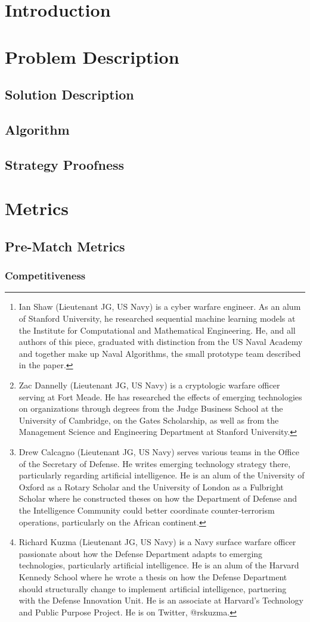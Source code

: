 \documentclass{article}
\title{\projectname}
\author{Ian Shaw \thanks{Ian Shaw (Lieutenant JG, US Navy) is a cyber warfare engineer. As an alum of Stanford University, he researched sequential machine learning models at the Institute for Computational and Mathematical Engineering. He, and all authors of this piece, graduated with distinction from the US Naval Academy and together make up Naval Algorithms, the small prototype team described in the paper. } 
\and Zac Dannelly \thanks{Zac Dannelly (Lieutenant JG, US Navy) is a cryptologic warfare officer serving at Fort Meade. He has researched the effects of emerging technologies on organizations through degrees from the Judge Business School at the University of Cambridge, on the Gates Scholarship, as well as from the Management Science and Engineering Department at Stanford University.}
\and Drew Calcagno \thanks{Drew Calcagno (Lieutenant JG, US Navy) serves various teams in the Office of the Secretary of Defense. He writes emerging technology strategy there, particularly regarding artificial intelligence. He is an alum of the University of Oxford as a Rotary Scholar and the University of London as a Fulbright Scholar where he constructed theses on how the Department of Defense and the Intelligence Community could better coordinate counter-terrorism operations, particularly on the African continent.} 
\and Richard Kuzma \thanks{Richard Kuzma (Lieutenant JG, US Navy) is a Navy surface warfare officer passionate about how the Defense Department adapts to emerging technologies, particularly artificial intelligence. He is an alum of the Harvard Kennedy School where he wrote a thesis on how the Defense Department should structurally change to implement artificial intelligence, partnering with the Defense Innovation Unit. He is an associate at Harvard’s Technology and Public Purpose Project. He is on Twitter, @rskuzma.}}
\begin{document}
\maketitle

\begin{abstract}

\end{abstract}

\newpage

\tableofcontents

\newpage

\section{Introduction}



\section{Problem Description}



\subsection{Solution Description}



\subsection{Algorithm}



\subsection{Strategy Proofness}



\section{Metrics}

\subsection{Pre-Match Metrics}

\subsubsection{Competitiveness}
\end{document}
